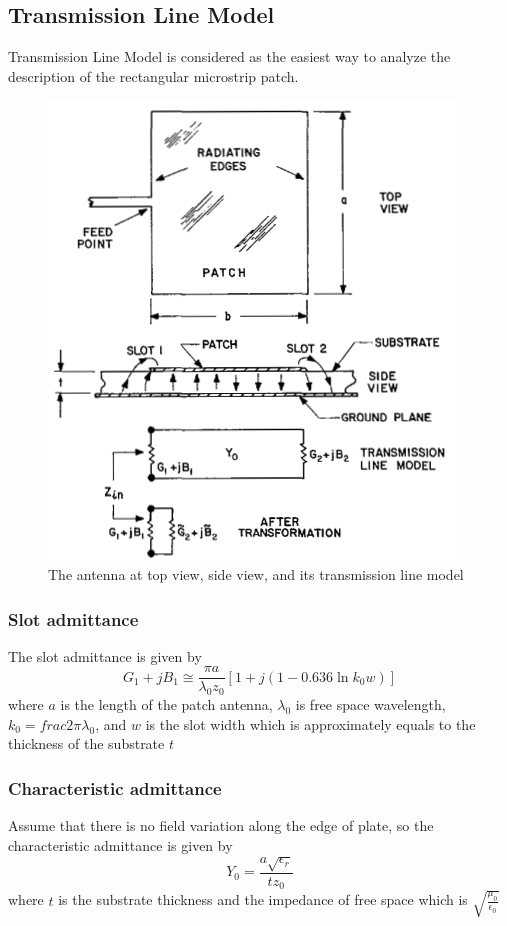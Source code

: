 \documentclass[11pt,a4paper]{article}
\begin{document}
    \subsection{Transmission Line Model}
      \indent Transmission Line Model is considered as the easiest way to analyze the description of the
              rectangular microstrip patch.
      \begin{figure}[ht]
        \includegraphics{tmmodel.png}
          \centering
          \caption{The antenna at top view, side view, and its transmission line model\cite{CaM:81}}
      \end{figure}

      \subsubsection{Slot admittance}
        \indent The slot admittance is given by \cite{CaM:81}
        \begin{equation}
          G_1 + jB_1 \cong \frac{\pi {a}}{\lambda_0 z_0}[1 + j(1-0.636\ln{k_0w})]
        \end{equation}
        \indent where $a$ is the length of the patch antenna, $\lambda_0$ is free space wavelength,
                $k_0 = frac{2\pi}{\lambda_0}$, and $w$ is the slot width which is approximately
                equals to the thickness of the substrate $t$ 

      \subsubsection{Characteristic admittance}
        \indent Assume that there is no field variation along the edge of plate, so the characteristic admittance is given by \cite{CaM:81}
        \begin{equation}
          Y_0 = \frac{a\sqrt{\epsilon_r}}{tz_0}
        \end{equation}
        \indent where $t$ is the substrate thickness and the impedance of free space which is $\sqrt{\frac{\mu_0}{\epsilon_0}}$
\end{document}
